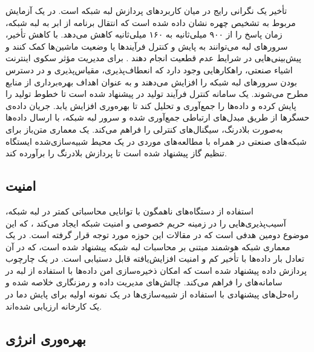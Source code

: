 تأخیر یک نگرانی رایج در میان کاربردهای پردازش لبه شبکه است. در یک آزمایش مربوط به تشخیص چهره \cite{yi2015fog} نشان داده شده است که انتقال برنامه از ابر به لبه شبکه، زمان پاسخ را از ۹۰۰ میلی‌ثانیه به ۱۶۰ میلی‌ثانیه کاهش می‌دهد. با کاهش تأخیر، سرورهای لبه می‌توانند به پایش و کنترل فرآیندها \cite{li2018deep} یا وضعیت ماشین‌ها \cite{bose2019adepos} کمک کنند و پیش‌بینی‌هایی در شرایط عدم قطعیت انجام دهند \cite{taik2020electrical}. برای مدیریت مؤثر سکوی اینترنت اشیاء صنعتی، راهکارهایی وجود دارد که انعطاف‌پذیری، مقیاس‌پذیری و در دسترس بودن سرورهای لبه شبکه را افزایش می‌دهند و به عنوان اهداف بهره‌برداری از منابع مطرح می‌شوند. یک سامانه کنترل فرآیند تولید در \cite{wu2017fog} پیشنهاد شده است تا خطوط تولید را پایش کرده و داده‌ها را جمع‌آوری و تحلیل کند تا بهره‌وری افزایش یابد. جریان داده‌ی حسگرها از طریق مبدل‌های ارتباطی جمع‌آوری شده و سرور لبه شبکه، با ارسال داده‌ها به‌صورت بلادرنگ، سیگنال‌های کنترلی را فراهم می‌کند. یک معماری متن‌باز برای شبکه‌های صنعتی در \cite{vakili2019open} همراه با مطالعه‌های موردی در یک محیط شبیه‌سازی‌شده ایستگاه تنظیم گاز پیشنهاد شده است تا پردازش بلادرنگ را برآورده کند.

\subsection{امنیت}

استفاده از دستگاه‌های ناهمگون با توانایی محاسباتی کمتر در لبه شبکه، آسیب‌پذیری‌هایی را در زمینه حریم خصوصی و امنیت شبکه ایجاد می‌کند \cite{wu2021blockchain}، که این موضوع دومین هدفی است که در مقالات این حوزه مورد توجه قرار گرفته است. در \cite{chekired2018industrial} یک معماری شبکه هوشمند مبتنی بر محاسبات لبه شبکه پیشنهاد شده است، که در آن تعادل بار داده‌ها با تأخیر کم و امنیت افزایش‌یافته قابل دستیابی است. در \cite{fu2018secure} یک چارچوب پردازش داده پیشنهاد شده است که امکان ذخیره‌سازی امن داده‌ها با استفاده از لبه در سامانه‌های  را فراهم می‌کند. چالش‌های مدیریت داده و رمزنگاری خلاصه شده و راه‌حل‌های پیشنهادی با استفاده از شبیه‌سازی‌ها در یک نمونه اولیه برای پایش دما در یک کارخانه ارزیابی شده‌اند.

\subsection{بهره‌وری انرژی}

